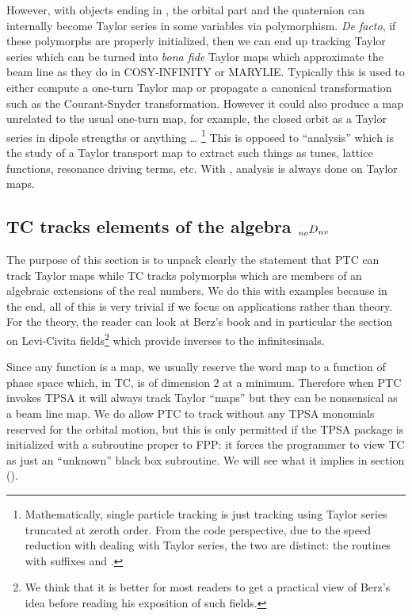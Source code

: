 \documentclass{hitec}     %
\begin{document}
{{{{\color{h} However,  with  objects ending in  , the orbital part and the quaternion can   internally become Taylor series in some variables via polymorphism.
{\it De facto}, if these polymorphs are properly initialized, then we can end up tracking Taylor series which can be turned into {\it bona fide} Taylor maps which approximate the beam line as they do in COSY-INFINITY or MARYLIE. Typically this is used to either compute a one-turn Taylor map or propagate a 
canonical transformation such as the Courant-Snyder transformation. However it could also produce a map unrelated to the usual one-turn map, for example, the closed orbit as a Taylor series in  dipole strengths or anything \ldots}
 \footnote
  {
Mathematically, single particle tracking is just tracking  using Taylor series
truncated at zeroth order. From the code perspective, due to the speed reduction with dealing with
Taylor series, the two are distinct: the routines with suffixes  and .
  }
This is opposed to ``analysis'' which is the study of a {\color{h} Taylor} transport map to extract such things as
tunes, lattice functions, resonance driving terms, etc. With , analysis is always done on  {\color{h} Taylor}  maps.

\subsection{TC tracks elements of the algebra $\prescript{}{no}{D}_{nv}$
}
\label{s:tpsadef}

The purpose of this section is to unpack clearly the statement that PTC can track Taylor maps while TC tracks polymorphs which are members of an algebraic extensions of the real numbers. We do this with examples because in the end, all of this is very trivial if we focus on applications rather than theory. For the theory, the reader can look at Berz's book \cite{theberzbook} and in particular  the section on Levi-Civita fields\footnote{We think that it is better for most readers to get a practical view of Berz's idea before reading his exposition of such fields.} which provide inverses to the infinitesimals.

Since any function is a map, we usually reserve the word map to a function of phase space which, in TC, is of dimension 2 at a minimum. Therefore when PTC invokes TPSA it will always track Taylor ``maps'' but they can be nonsensical as a beam line map. We do  allow PTC  to track without any TPSA monomials reserved for the orbital motion, but this is only  permitted if the TPSA package is initialized with a subroutine proper to FPP: it forces the programmer to view TC as  just  an ``unknown'' black box subroutine. We will see what it implies  in section ().


}}}
\end{document}
